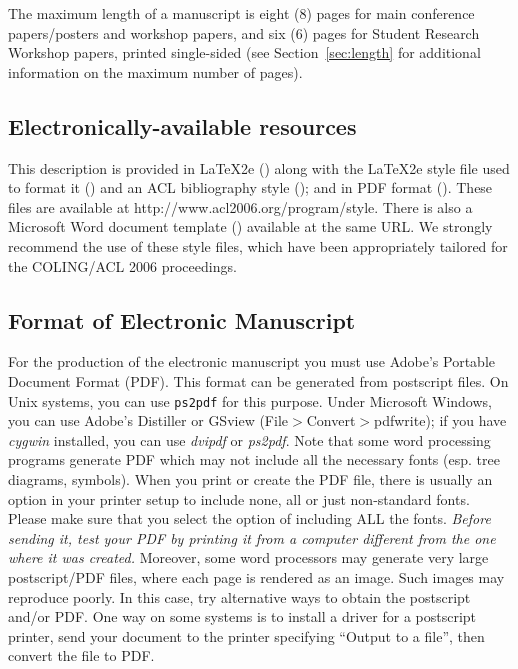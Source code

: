 \documentclass[11pt]{article}
\begin{document}
The maximum length of a manuscript is eight (8) pages for main conference papers/posters and workshop papers, and six (6) pages for Student Research Workshop papers, printed single-sided (see Section~\ref{sec:length} for additional information on the maximum number of pages).


\subsection{Electronically-available resources}

This description is provided in \LaTeX2e ()  along with the \LaTeX2e style file used to format it () and an ACL bibliography style (); and in PDF format (). These files are available at http://www.acl2006.org/program/style.  There is also a Microsoft Word document template () available at the same URL. We strongly recommend the use of these style files, which have been appropriately tailored for the COLING/ACL 2006 proceedings.


\subsection{Format of Electronic Manuscript}
\label{sect:pdf}

For the production of the electronic manuscript you must use Adobe's
Portable Document Format (PDF). This format can be generated from
postscript files. On Unix systems, you can use {\tt ps2pdf} for
this purpose. Under Microsoft Windows, you can use Adobe's Distiller
or GSview (File$>$Convert$>$pdfwrite); if you have \textit{cygwin}
installed, you can use \textit{dvipdf} or \textit{ps2pdf}. Note that
some word processing programs generate PDF which may not include all
the necessary fonts (esp. tree diagrams, symbols). When you print or
create the PDF file, there is usually an option in your printer setup
to include none, all or just non-standard fonts.  Please make sure
that you select the option of including ALL the fonts. {\em Before
sending it, test your PDF by printing it from a computer different
from the one where it was created.} Moreover, some word processors may
generate very large postscript/PDF files, where each page is rendered
as an image. Such images may reproduce poorly. In this case, try
alternative ways to obtain the postscript and/or PDF. One way on some
systems is to install a driver for a postscript printer, send your
document to the printer specifying ``Output to a file'', then convert
the file to PDF.
\end{document}
